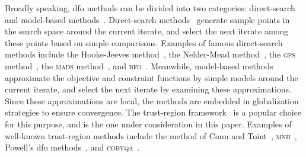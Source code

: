 \documentclass[draft]{article}
\numberwithin{equation}{section}
\theoremstyle{definition}
\theoremstyle{plain}
\newcommand*{\solvername}[1]{\textsc{#1}\xspace}
\begin{document}
Broadly speaking, \gls{dfo} methods can be divided into two categories: direct-search and model-based methods~\cite{Conn_Scheinberg_Vicente_2009}.
Direct-search methods~\cite{Kolda_Lewis_Torczon_2003} generate sample points in the search space around the current iterate, and select the next iterate among these points based on simple comparisons.
Examples of famous direct-search methods include the Hooke-Jeeves method~\cite{Hooke_Jeeves_1961}, the Nelder-Mead method~\cite{Nelder_Mead_1965}, the \solvername{gps} method~\cite{Booker_Etal_1999}, the \solvername{mads} method~\cite{Audet_Dennis_2006}, and \solvername{bfo}~\cite{Porcelli_Toint_2017,Porcelli_Toint_2022}.
Meanwhile, model-based methods~\cite[Part~4]{Audet_Hare_2017} approximate the objective and constraint functions by simple models around the current iterate, and select the next iterate by examining these approximations.
Since these approximations are local, the methods are embedded in globalization strategies to ensure convergence.
The trust-region framework~\cite{Conn_Gould_Toint_2000} is a popular choice for this purpose, and is the one under consideration in this paper.
Examples of well-known trust-region methods include the method of Conn and Toint~\cite{Conn_Toint_1996}, \solvername{mnh}~\cite{Wild_2008}, Powell's \gls{dfo} methods~\cite{Powell_1994,Powell_2002,Powell_2006,Powell_2009}, and \solvername{cobyqa}~\cite{Ragonneau_2022,Ragonneau_Zhang_2023}.
\end{document}
